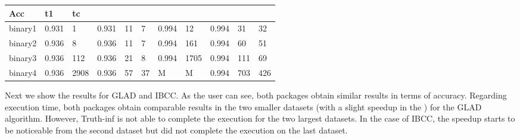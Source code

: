 \documentclass[letterpaper,10pt,english]{sphinxmanual}
\begin{document}
\begin{savenotes}
\begin{tabulary}{\linewidth}[t]{|T|T|T|T|T|T|T|T|T|T|T|}
Acc
&\sphinxstyletheadfamily 
t1
&\sphinxstyletheadfamily 
tc
\\
\hline
binary1
&
0.931
&
1
&
0.931
&
11
&
7
&
0.994
&
12
&
0.994
&
31
&
32
\\
\hline
binary2
&
0.936
&
8
&
0.936
&
11
&
7
&
0.994
&
161
&
0.994
&
60
&
51
\\
\hline
binary3
&
0.936
&
112
&
0.936
&
21
&
8
&
0.994
&
1705
&
0.994
&
111
&
69
\\
\hline
binary4
&
0.936
&
2908
&
0.936
&
57
&
37
&
M
&
M
&
0.994
&
703
&
426
\\
\hline
\end{tabulary}
\par
\sphinxattableend\end{savenotes}

Next we show the results for GLAD and IBCC. As the user can see, both packages obtain similar results
in terms of accuracy. Regarding execution time, both packages obtain comparable results
in the two smaller datasets (with a slight speedup in the ) for the GLAD algorithm. However,
Truth-inf is not able to complete the execution for the two largest datasets.
In the case of IBCC, the speedup starts to be noticeable from the second dataset but did not complete the execution 
on the last dataset. 
\end{document}
